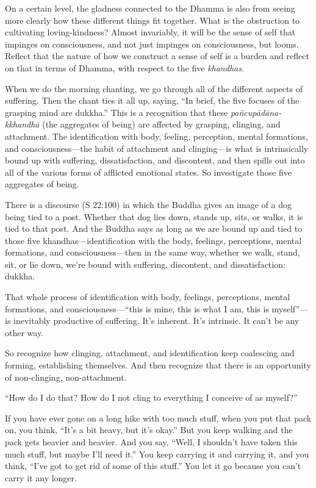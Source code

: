 On a certain level, the gladness connected to the Dhamma is also from
seeing more clearly how these different things fit together. What is the
obstruction to cultivating loving-kindness? Almost invariably, it will
be the sense of self that impinges on consciousness, and not just
impinges on consciousness, but looms. Reflect that the nature of how we
construct a sense of self is a burden and reflect on that in terms of
Dhamma, with respect to the five \emph{khandhas}.

When we do the morning chanting, we go through all of the different
aspects of suffering. Then the chant ties it all up, saying, “In brief,
the five focuses of the grasping mind are dukkha.” This is a recognition
that these \emph{pañcupādāna-kkhandhā} (the aggregates of being) are
affected by grasping, clinging, and attachment. The identification with
body, feeling, perception, mental formations, and consciousness—the
habit of attachment and clinging—is what is intrinsically bound up with
suffering, dissatisfaction, and discontent, and then spills out into all
of the various forms of afflicted emotional states. So investigate those
five aggregates of being.

There is a discourse (S 22:100) in which the Buddha gives an image of a
dog being tied to a post. Whether that dog lies down, stands up, sits,
or walks, it is tied to that post. And the Buddha says as long as we are
bound up and tied to those five khandhas—identification with the body,
feelings, perceptions, mental formations, and consciousness—then in the
same way, whether we walk, stand, sit, or lie down, we’re bound with
suffering, discontent, and dissatisfaction: dukkha.

That whole process of identification with body, feelings, perceptions,
mental formations, and consciousness—“this is mine, this is what I am,
this is myself”—is inevitably productive of suffering. It’s inherent.
It’s intrinsic. It can’t be any other way.

So recognize how clinging, attachment, and identification keep
coalescing and forming, establishing themselves. And then recognize that
there is an opportunity of non-clinging, non-attachment.

“How do I do that? How do I not cling to everything I conceive of as
myself?”

If you have ever gone on a long hike with too much stuff, when you put
that pack on, you think, “It’s a bit heavy, but it’s okay.” But you keep
walking and the pack gets heavier and heavier. And you say, “Well, I
shouldn’t have taken this much stuff, but maybe I’ll need it.” You keep
carrying it and carrying it, and you think, “I’ve got to get rid of some
of this stuff.” You let it go because you can’t carry it any longer.

